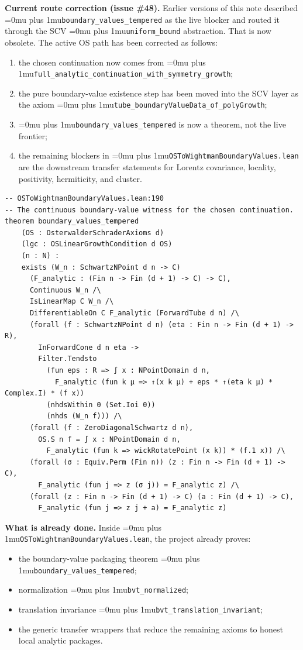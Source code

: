 \documentclass[11pt,a4paper]{article}
\newcommand{\leanfile}[1]{\begingroup\Urlmuskip=0mu plus 1mu\relax\nolinkurl{#1}\endgroup}
\newcommand{\leanname}[1]{\begingroup\Urlmuskip=0mu plus 1mu\relax\nolinkurl{#1}\endgroup}
\begin{document}
\medskip\noindent
\textbf{Current route correction (issue \#48).}
Earlier versions of this note described
\leanname{boundary\_values\_tempered} as the live blocker and routed it through
the SCV \leanname{uniform\_bound} abstraction. That is now obsolete. The active
OS path has been corrected as follows:
\begin{enumerate}
\item the chosen continuation now comes from
  \leanname{full\_analytic\_continuation\_with\_symmetry\_growth};
\item the pure boundary-value existence step has been moved into the SCV layer
  as the axiom \leanname{tube\_boundaryValueData\_of\_polyGrowth};
\item \leanname{boundary\_values\_tempered} is now a theorem, not the live
  frontier;
\item the remaining blockers in
  \leanfile{OSToWightmanBoundaryValues.lean} are the downstream transfer
  statements for Lorentz covariance, locality, positivity, hermiticity, and
  cluster.
\end{enumerate}

\begin{lstlisting}
-- OSToWightmanBoundaryValues.lean:190
-- The continuous boundary-value witness for the chosen continuation.
theorem boundary_values_tempered
    (OS : OsterwalderSchraderAxioms d)
    (lgc : OSLinearGrowthCondition d OS)
    (n : N) :
    exists (W_n : SchwartzNPoint d n -> C)
      (F_analytic : (Fin n -> Fin (d + 1) -> C) -> C),
      Continuous W_n /\
      IsLinearMap C W_n /\
      DifferentiableOn C F_analytic (ForwardTube d n) /\
      (forall (f : SchwartzNPoint d n) (eta : Fin n -> Fin (d + 1) -> R),
        InForwardCone d n eta ->
        Filter.Tendsto
          (fun eps : R => ∫ x : NPointDomain d n,
            F_analytic (fun k μ => ↑(x k μ) + eps * ↑(eta k μ) * Complex.I) * (f x))
          (nhdsWithin 0 (Set.Ioi 0))
          (nhds (W_n f))) /\
      (forall (f : ZeroDiagonalSchwartz d n),
        OS.S n f = ∫ x : NPointDomain d n,
          F_analytic (fun k => wickRotatePoint (x k)) * (f.1 x)) /\
      (forall (σ : Equiv.Perm (Fin n)) (z : Fin n -> Fin (d + 1) -> C),
        F_analytic (fun j => z (σ j)) = F_analytic z) /\
      (forall (z : Fin n -> Fin (d + 1) -> C) (a : Fin (d + 1) -> C),
        F_analytic (fun j => z j + a) = F_analytic z)
\end{lstlisting}

\noindent\textbf{What is already done.}
Inside \leanfile{OSToWightmanBoundaryValues.lean}, the project already proves:
\begin{itemize}
\item the boundary-value packaging theorem \leanname{boundary\_values\_tempered};
\item normalization \leanname{bvt\_normalized};
\item translation invariance \leanname{bvt\_translation\_invariant};
\item the generic transfer wrappers that reduce the remaining axioms to honest
  local analytic packages.
\end{itemize}
\end{document}
